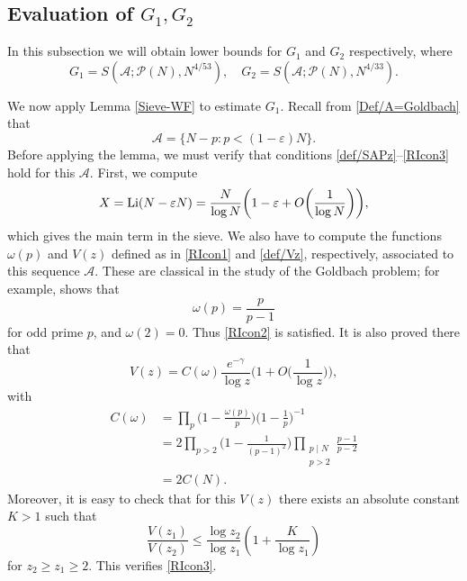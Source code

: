 \documentclass[12pt, a4paper]{amsart}
\def\Li{\hbox{{\rm Li}}}
\def\le{\leqslant}
\def\ge{\geqslant}
\theoremstyle{plain}
\theoremstyle{remark}
\numberwithin{equation}{section}
\begin{document}
\subsection{Evaluation of $G_1, G_2$}
In this subsection we will obtain lower bounds for $G_1$ and $G_2$ respectively, 
where
\[
G_1 = S(\mathscr{A}; \mathscr{P}(N), N^{4/53}), 
\quad 
G_2 = S(\mathscr{A}; \mathscr{P}(N), N^{4/33}).
\] 
	
We now apply Lemma \ref{Sieve-WF} to estimate \(G_1\).  
Recall from \eqref{Def/A=Goldbach} that  
\begin{equation}\label{New/A=}
\mathscr{A}=\{N-p:p<(1-\varepsilon)N\}. 
\end{equation}
Before applying the lemma, we must verify that conditions \eqref{def/SAPz}--\eqref{RIcon3} hold for this \(\mathscr{A}\).  
First, we compute  
\begin{equation}\label{G1X}
X=\Li(N-\varepsilon N)=\dfrac{N}{\log N}\bigg(1-\varepsilon+O\bigg(\dfrac{1}{\log N}\bigg)\bigg), 
\end{equation}
which gives the main term in the sieve. 
We also have to compute the functions $\omega(p)$ and $V(z)$ defined as in \eqref{RIcon1} and \eqref{def/Vz}, respectively,  
associated to this sequence $\mathscr{A}$. 
These are classical in the study of the Goldbach problem; for example, \cite[\S1.3, Example 5]{HR74} shows that  
\begin{equation}\label{New/ome/p}
\omega(p)= \frac{p}{p-1}
\end{equation}
for odd prime $p$, and $\omega(2)=0$. Thus \eqref{RIcon2} is satisfied. 
It is also proved there that 
\begin{equation}\label{Vz}
V(z) = C(\omega) \frac{e^{-\gamma}}{\log z} \bigg(1 + O\bigg(\frac{1}{\log z}\bigg)\bigg), 
\end{equation}
with 
\begin{equation}\label{Come/G1}
\begin{aligned}
C(\omega) &= \prod_p \bigg(1 - \frac{\omega(p)}{p}\bigg) \bigg(1 - \frac{1}{p}\bigg)^{-1} \\
&= 2 \prod_{p > 2} \bigg(1 - \frac{1}{(p-1)^2}\bigg) \prod_{\substack{p \mid N \\ p > 2}} \frac{p-1}{p-2} \\
&= 2C(N).
\end{aligned}
\end{equation}
Moreover, it is easy to check that for this $V(z)$ 
there exists an absolute constant $K > 1$ such that
\begin{equation}\label{Vz1/Vz2/G1}
\frac{V(z_1)}{V(z_2)} \le \frac{\log z_2}{\log z_1} \left( 1 + \frac{K}{\log z_1} \right)
\end{equation}
for $z_2 \ge z_1 \ge 2$. This verifies \eqref{RIcon3}. 
\end{document}
